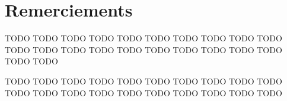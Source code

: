 \chapter*{Remerciements}
{}
 TODO TODO TODO TODO TODO TODO TODO TODO TODO TODO TODO TODO TODO TODO TODO TODO TODO TODO TODO TODO TODO TODO

 TODO TODO TODO TODO TODO TODO TODO TODO TODO TODO TODO TODO TODO TODO TODO TODO TODO TODO TODO TODO
